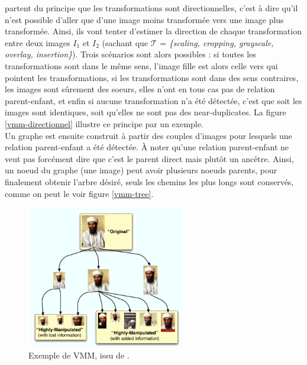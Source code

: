\documentclass[utf8,final]{stageM2R} %
\begin{document}
 partent du principe que les transformations sont directionnelles, c'est à dire qu'il n'est possible d'aller que d'une image moins transformée vers une image plus transformée. Ainsi, ils vont tenter d'estimer la direction de chaque transformation entre deux images $I_{1}$ et $I_{2}$ (sachant que $\mathcal{T}$ = \textit{\{scaling, cropping, grayscale, overlay, insertion\}}). Trois scénarios sont alors possibles : si toutes les transformations sont dans le même sens, l'image fille est alors celle vers qui pointent les transformations, si les transformations sont dans des sens contraires, les images sont sûrement des soeurs, elles n'ont en tous cas pas de relation parent-enfant, et enfin si aucune transformation n'a été détectée, c'est que soit les images sont identiques, soit qu'elles ne sont pas des near-duplicates. La figure \ref{vmm-directionnel} illustre ce principe par un exemple.
\\ \indent
Un graphe est ensuite construit à partir des couples d'images pour lesquels une relation parent-enfant a été détectée. À noter qu'une relation parent-enfant ne veut pas forcément dire que c'est le parent direct mais plutôt un ancêtre. Ainsi, un noeud du graphe (une image) peut avoir plusieurs noeuds parents, pour finalement obtenir l'arbre désiré, seuls les chemins les plus longs sont conservés, comme on peut le voir figure \ref{vmm-tree}.



\begin{figure}
  \begin{center}
    \includegraphics[width=70mm]{images/vmm.png}
    \caption{Exemple de VMM, issu de \autocite{kennedy2008internet}.}
    \label{vmm}
  \end{center}
\end{figure}
\end{document}
